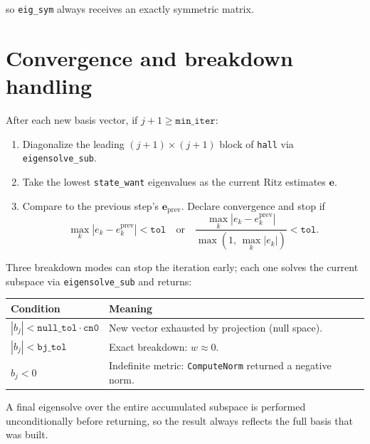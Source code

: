 \documentclass[11pt]{article}
\begin{document}
so \texttt{eig\_sym} always receives an exactly symmetric matrix.

\section{Convergence and breakdown handling}

After each new basis vector, if $j + 1 \ge \texttt{min\_iter}$:
\begin{enumerate}
  \item Diagonalize the leading $(j{+}1)\times(j{+}1)$ block of
        \texttt{hall} via \texttt{eigensolve\_sub}.
  \item Take the lowest \texttt{state\_want} eigenvalues as the current
        Ritz estimates $\mathbf{e}$.
  \item Compare to the previous step's $\mathbf{e}_{\mathrm{prev}}$.
        Declare convergence and stop if
        \begin{equation}
          \max_k |e_k - e_k^{\mathrm{prev}}| < \texttt{tol}
          \quad\text{or}\quad
          \frac{\max_k |e_k - e_k^{\mathrm{prev}}|}{\max(1,\,\max_k|e_k|)}
          < \texttt{tol}.
        \end{equation}
\end{enumerate}

Three breakdown modes can stop the iteration early; each one solves
the current subspace via \texttt{eigensolve\_sub} and returns:

\begin{center}
\begin{tabular}{@{}ll@{}}
  \toprule
  Condition & Meaning \\
  \midrule
  $|b_j| < \texttt{null\_tol}\cdot\texttt{cn0}$
    & New vector exhausted by projection (null space). \\
  $|b_j| < \texttt{bj\_tol}$
    & Exact breakdown: $w \approx 0$. \\
  $b_j < 0$
    & Indefinite metric: \texttt{ComputeNorm} returned a negative norm. \\
  \bottomrule
\end{tabular}
\end{center}

A final eigensolve over the entire accumulated subspace is performed
unconditionally before returning, so the result always reflects the
full basis that was built.
\end{document}
